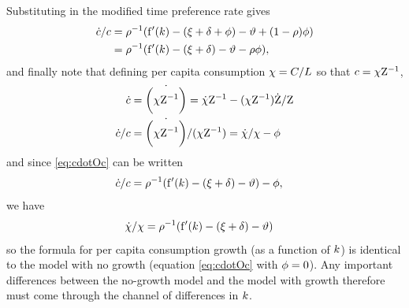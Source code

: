 \documentclass{handout}
\begin{document}
Substituting in the modified time preference rate gives
\begin{equation}\begin{gathered}\begin{aligned}
  \dot{c}/c  & =  \rho^{-1}(\mathrm{f}^{\prime}({k})-(\xi+\delta+\phi)-\vartheta  +(1- \rho) \phi)
  \\   & =  \rho^{-1}(\mathrm{f}^{\prime}({k})-(\xi+\delta)-\vartheta  - \rho \phi), \label{eq:cdotOc}
\end{aligned}\end{gathered}\end{equation}
and finally note that defining per capita consumption $\chi = C/L$
so that $c = \chi \mathrm{Z} ^{-1}$, 
\begin{equation}\begin{gathered}\begin{aligned}
  \label{eq:chiDotOchi}
  \dot{c} & =  \dot{\biggl(\chi \mathrm{Z} ^{-1}\biggr)} =  \dot{\chi}\mathrm{Z} ^{-1}-(\chi \mathrm{Z} ^{-1})\dot{\mathrm{Z} }/\mathrm{Z} 
  \\ \dot{c}/c & =  \dot{\biggl(\chi \mathrm{Z} ^{-1}\biggr)}/(\chi \mathrm{Z}^{-1}) =  \dot{\chi}/\chi - \phi 
\end{aligned}\end{gathered}\end{equation}
and since \eqref{eq:cdotOc} can be written
\begin{equation}\begin{gathered}\begin{aligned}
  \dot{c}/c  & =  \rho^{-1}(\mathrm{f}^{\prime}({k})-(\xi+\delta)-\vartheta ) - \phi,
\end{aligned}\end{gathered}\end{equation}
we have
\begin{equation}\begin{gathered}\begin{aligned}
  \dot{\chi}/\chi & =  \rho^{-1}(\mathrm{f}^{\prime}({k})-(\xi+\delta)-\vartheta )
\end{aligned}\end{gathered}\end{equation}
so the formula for per capita consumption growth (as a function of
${k}$) is identical to the model with no growth (equation
\eqref{eq:cdotOc} with $\phi=0$).  Any important differences between
the no-growth model and the model with growth therefore must come
through the channel of differences in ${k}$.
\end{document}
